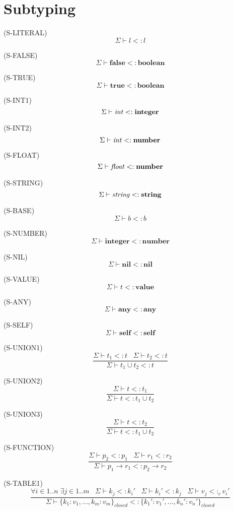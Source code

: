 \documentclass{paper}
\newcommand{\Value}{\mathbf{value}}
\newcommand{\Any}{\mathbf{any}}
\newcommand{\Nil}{\mathbf{nil}}
\newcommand{\Self}{\mathbf{self}}
\newcommand{\False}{\mathbf{false}}
\newcommand{\True}{\mathbf{true}}
\newcommand{\Boolean}{\mathbf{boolean}}
\newcommand{\Integer}{\mathbf{integer}}
\newcommand{\Number}{\mathbf{number}}
\newcommand{\String}{\mathbf{string}}
\newcommand{\mylabel}[1]{\; (\textsc{#1})}
\newcommand{\senv}{\Sigma}
\newcommand{\subtype}{<:}
\begin{document}
\section{Subtyping}

\noindent

\mylabel{S-LITERAL}
\[
\senv \vdash l \subtype l
\]

\mylabel{S-FALSE}
\[
\senv \vdash \False \subtype \Boolean
\]

\mylabel{S-TRUE}
\[
\senv \vdash \True \subtype \Boolean
\]

\mylabel{S-INT1}
\[
\senv \vdash {\it int} \subtype \Integer
\]

\mylabel{S-INT2}
\[
\senv \vdash {\it int} \subtype \Number
\]

\mylabel{S-FLOAT}
\[
\senv \vdash {\it float} \subtype \Number
\]

\mylabel{S-STRING}
\[
\senv \vdash {\it string} \subtype \String
\]

\mylabel{S-BASE}
\[
\senv \vdash b \subtype b
\]

\mylabel{S-NUMBER}
\[
\senv \vdash \Integer \subtype \Number
\]

\mylabel{S-NIL}
\[
\senv \vdash \Nil \subtype \Nil
\]

\mylabel{S-VALUE}
\[
\senv \vdash t \subtype \Value
\]

\mylabel{S-ANY}
\[
\senv \vdash \Any \subtype \Any
\]

\mylabel{S-SELF}
\[
\senv \vdash \Self \subtype \Self
\]

\mylabel{S-UNION1}
\[
\dfrac{\senv \vdash t_{1} \subtype t \;\;\;
       \senv \vdash t_{2} \subtype t}
      {\senv \vdash t_{1} \cup t_{2} \subtype t}
\]

\mylabel{S-UNION2}
\[
\dfrac{\senv \vdash t \subtype t_{1}}
      {\senv \vdash t \subtype t_{1} \cup t_{2}}
\]

\mylabel{S-UNION3}
\[
\dfrac{\senv \vdash t \subtype t_{2}}
      {\senv \vdash t \subtype t_{1} \cup t_{2}}
\]

\mylabel{S-FUNCTION}
\[
\dfrac{\senv \vdash p_{2} \subtype p_{1} \;\;\;
       \senv \vdash r_{1} \subtype r_{2}}
      {\senv \vdash p_{1} \rightarrow r_{1} \subtype p_{2} \rightarrow r_{2}}
\]

\mylabel{S-TABLE1}
\[
\dfrac{\forall i \in 1..n \; \exists j \in 1..m \;\;\;
       \senv \vdash k_{j} \subtype k_{i}' \;\;\;
       \senv \vdash k_{i}' \subtype k_{j} \;\;\;
       \senv \vdash v_{j} \subtype_{c} v_{i}'}
      {\senv \vdash \{k_{1}{:}v_{1}, ..., k_{m}{:}v_{m}\}_{closed} \subtype \{k_{1}'{:}v_{1}', ..., k_{n}'{:}v_{n}'\}_{closed}}
\]
\end{document}
